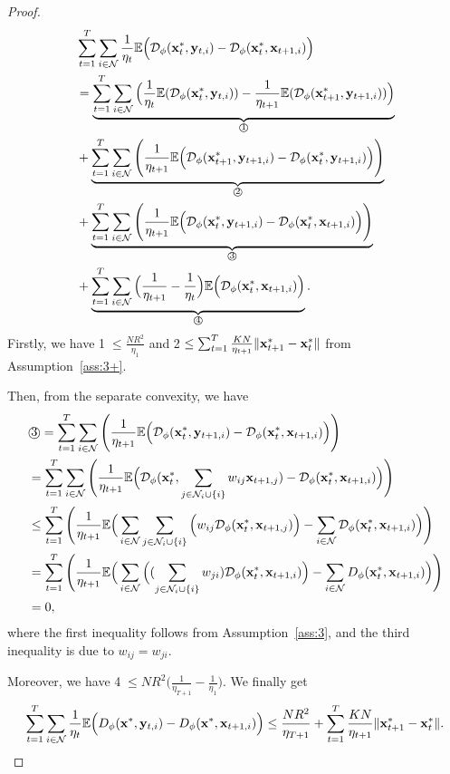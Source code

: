 	\begin{proof}
		\begin{equation*}
			\begin{aligned}
				&\sum_{t=1}^{T}\sum_{i\in\mathcal{N}}\frac{1}{\eta_{t}}\mathbb{E}\Big(\mathcal{D}_{\phi}(\mathbf{x}^{*}_{t},\mathbf{y}_{t,i})-\mathcal{D}_{\phi}(\mathbf{x}^{*}_{t},\mathbf{x}_{t+1,i})\Big)\\
				&=\underbrace{\sum_{t=1}^{T}\sum_{i\in\mathcal{N}}\Big(\frac{1}{\eta_{t}}\mathbb{E}(\mathcal{D}_{\phi}(\mathbf{x}^{*}_{t},\mathbf{y}_{t,i}))-\frac{1}{\eta_{t+1}}\mathbb{E}(\mathcal{D}_{\phi}(\mathbf{x}^{*}_{t+1},\mathbf{y}_{t+1,i}))\Big)}_{\text{\textcircled{1}}}\\
				&+\underbrace{\sum_{t=1}^{T}\sum_{i\in\mathcal{N}}\Bigg(\frac{1}{\eta_{t+1}}\mathbb{E}\Big(\mathcal{D}_{\phi}(\mathbf{x}^{*}_{t+1},\mathbf{y}_{t+1,i})-\mathcal{D}_{\phi}(\mathbf{x}^{*}_{t},\mathbf{y}_{t+1,i})\Big)\Bigg)}_{\text{\textcircled{2}}}\\
				&+\underbrace{\sum_{t=1}^{T}\sum_{i\in\mathcal{N}}\Bigg(\frac{1}{\eta_{t+1}}\mathbb{E}\Big(\mathcal{D}_{\phi}(\mathbf{x}^{*}_{t},\mathbf{y}_{t+1,i})-\mathcal{D}_{\phi}(\mathbf{x}^{*}_{t},\mathbf{x}_{t+1,i})\Big)\Bigg)}_{\text{\textcircled{3}}}\\
				&+\underbrace{\sum_{t=1}^{T}\sum_{i\in\mathcal{N}}\Big(\frac{1}{\eta_{t+1}}-\frac{1}{\eta_{t}}\Big)\mathbb{E}\Big(\mathcal{D}_{\phi}(\mathbf{x}^{*}_{t},\mathbf{x}_{t+1,i})\Big)}_{\text{\textcircled{4}}}.
			\end{aligned}
		\end{equation*}
		Firstly, we have \textcircled{1}$\le\frac{N R^{2}}{\eta_{1}}$ and \textcircled{2}$\le \sum_{t=1}^{T}\frac{KN} {\eta_{t+1}}\|\mathbf{x}^{*}_{t+1}-\mathbf{x}^{*}_{t}\|$ from Assumption~\ref{ass:3+}.
		
		Then, from the separate convexity, we have 
		\begin{equation*}
			\begin{aligned}
				&\text{\textcircled{3}}=\sum_{t=1}^{T}\sum_{i\in\mathcal{N}}\Bigg(\frac{1}{\eta_{t+1}}\mathbb{E}\Big(\mathcal{D}_{\phi}(\mathbf{x}^{*}_{t},\mathbf{y}_{t+1,i})-\mathcal{D}_{\phi}(\mathbf{x}^{*}_{t},\mathbf{x}_{t+1,i})\Big)\Bigg)\\
				&=\sum_{t=1}^{T}\sum_{i\in\mathcal{N}}\Bigg(\frac{1}{\eta_{t+1}}\mathbb{E}\Big(\mathcal{D}_{\phi}(\mathbf{x}^{*}_{t},\sum_{j\in\mathcal{N}_{i}\cup\{i\}}w_{ij}\mathbf{x}_{t+1,j})-\mathcal{D}_{\phi}(\mathbf{x}^{*}_{t},\mathbf{x}_{t+1,i})\Big)\Bigg)\\		
				&\le\sum_{t=1}^{T}\Bigg(\frac{1}{\eta_{t+1}}\mathbb{E}\Big(\sum_{i\in\mathcal{N}}\sum_{j\in\mathcal{N}_{i}\cup\{i\}}\Big(w_{ij}\mathcal{D}_{\phi}(\mathbf{x}^{*}_{t},\mathbf{x}_{t+1,j})\Big)-\sum_{i\in\mathcal{N}}\mathcal{D}_{\phi}(\mathbf{x}^{*}_{t},\mathbf{x}_{t+1,i})\Big)\Bigg)\\		
				&=\sum_{t=1}^{T}\Bigg(\frac{1}{\eta_{t+1}}\mathbb{E}\Big(\sum_{i\in\mathcal{N}}\Big((\sum_{j\in\mathcal{N}_{i}\cup\{i\}}w_{ji})\mathcal{D}_{\phi}(\mathbf{x}^{*}_{t},\mathbf{x}_{t+1,i})\Big)-\sum_{i\in\mathcal{N}}D_{\phi}(\mathbf{x}^{*}_{t},\mathbf{x}_{t+1,i})\Big)\Bigg)\\		
				&=0,
			\end{aligned}
		\end{equation*} where the first inequality follows from Assumption~\ref{ass:3}, and the third inequality is due to $w_{ij}=w_{ji}$.
		
		Moreover, we have \textcircled{4}$\le NR^{2}\Big(\frac{1}{\eta_{T+1}}-\frac{1}{\eta_{1}}\Big)$. We finally get 
		\begin{equation*}
		\sum_{t=1}^{T}\sum_{i\in\mathcal{N}}\frac{1}{\eta_{t}}\mathbb{E}\Big(D_{\phi}(\mathbf{x}^{*},\mathbf{y}_{t,i})-D_{\phi}(\mathbf{x}^{*},\mathbf{x}_{t+1,i})\Big)\le \frac{NR^{2}}{\eta_{T+1}}+\sum_{t=1}^{T}\frac{KN} {\eta_{t+1}}\|\mathbf{x}^{*}_{t+1}-\mathbf{x}^{*}_{t}\|.
		\end{equation*}
	\end{proof}

